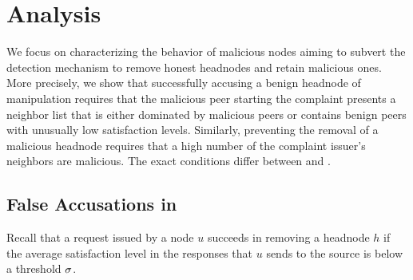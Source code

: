 \section{Analysis}
\label{sec:analysis}



We focus on characterizing the behavior of malicious nodes aiming to subvert the detection mechanism to remove honest headnodes and retain malicious ones. 
More precisely, we show that successfully accusing a benign headnode of manipulation requires that the malicious peer starting the complaint presents a neighbor list that is either dominated by malicious peers or contains benign peers with unusually low satisfaction levels. Similarly, preventing the removal of a malicious headnode requires that a high number of the complaint issuer's neighbors are malicious. 
The exact conditions differ between \drop and \manp.



\subsection{False Accusations in \drop} 
  
Recall that a \drop request issued by a node $u$ succeeds in removing a headnode $h$ if the average satisfaction level in the responses that $u$ sends to the source is below a threshold $\sigma$.  

